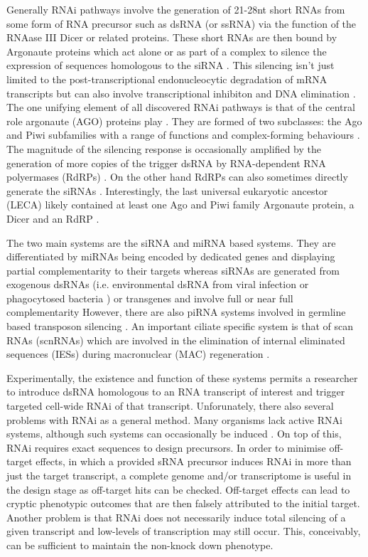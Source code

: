 Generally RNAi pathways involve the generation of 21-28nt short RNAs
from some form of RNA precursor such as dsRNA (or ssRNA)
via the function of the RNAase III Dicer \citep{Bernstein2001} or related proteins.
These short RNAs are then bound by Argonaute proteins which act alone or as part
of a complex to silence the expression of sequences homologous to the siRNA \citep{Ketting2011}.
This silencing isn't just limited to the post-transcriptional endonucleocytic degradation of 
mRNA transcripts but can also involve transcriptional inhibiton and
DNA elimination \citep{Marker2014}.
The one unifying element of all discovered RNAi pathways is that
of the central role argonaute (AGO) proteins play \citep{Ketting2011}.
They are formed of two subclasses: the Ago and Piwi subfamilies \citep{Peters2007}
with a range of functions and complex-forming behaviours
\citep{Ender2010}.
The magnitude of the silencing response is occasionally amplified by the generation
of more copies of the trigger dsRNA by RNA-dependent RNA polyermases (RdRPs) \citep{Arp2007}.
On the other hand RdRPs can also sometimes directly generate the siRNAs \citep{Aoki2007,Ketting2011}.
Interestingly, the last universal eukaryotic ancestor (LECA) likely contained 
at least one Ago and Piwi family Argonaute protein, a Dicer and an RdRP \citep{Cerutti2006}.

The two main systems are the siRNA and miRNA based systems.  They are differentiated
by miRNAs being encoded by dedicated genes and displaying partial
complementarity to their targets whereas siRNAs are generated from exogenous
dsRNAs (i.e. environmental dsRNA from viral infection or phagocytosed bacteria \citep{Whangbo2008})
or transgenes and involve full or near full complementarity \citep{Shabalina2008}
However, there are also piRNA systems involved in germline based transposon silencing \citep{Iwasaki2015}.
An important ciliate specific system is that of scan RNAs (scnRNAs) which 
are involved in the elimination of internal eliminated sequences (IESs) during
macronuclear (MAC) regeneration \citep{Mochizuki2004,Kiefer2013}.


Experimentally, the existence and function of these systems
permits a researcher to introduce dsRNA homologous to an RNA transcript of interest
and trigger targeted cell-wide RNAi of that transcript.
Unforunately, there also several problems with RNAi as a general method.
Many organisms lack active RNAi systems, although such systems can occasionally
be induced \citep{Alibu2005}.
On top of this, RNAi requires exact sequences to design precursors.
In order to minimise off-target effects, in which a provided sRNA precursor induces RNAi
in more than just the target transcript, a complete genome and/or transcriptome
is useful in the design stage as off-target hits can be checked. 
Off-target effects  can lead to cryptic
phenotypic outcomes that are then falsely attributed to the initial target.
Another problem is that RNAi does not necessarily induce total silencing
of a given transcript and low-levels of transcription may still occur.
This, conceivably, can be sufficient to maintain the non-knock down phenotype.

